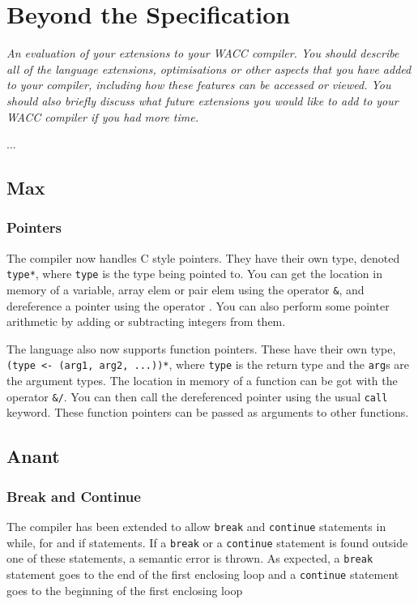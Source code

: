 \documentclass[]{article}
\newcommand{\spec}[1]{\textit{#1}\par\noindent}
\begin{document}
\section{Beyond the Specification}
\spec{An evaluation of your extensions to your WACC compiler. You should describe all of the language extensions, optimisations or other aspects that you have added to your compiler, including how these features can be accessed or viewed. You should also briefly discuss what future extensions you would like to add to your WACC compiler if you had more time.}
...
\subsection{Max}
\subsubsection{Pointers}
The compiler now handles C style pointers. They have their own type, denoted {\tt type*}, where {\tt type} is the type being pointed to. You can get the location in memory of a variable, array elem or pair elem using the operator {\tt \&}, and dereference a pointer using the operator {\tt *}. You can also perform some pointer arithmetic by adding or subtracting integers from them.

The language also now supports function pointers. These have their own type, {\tt (type <- (arg1, arg2, ...))*}, where {\tt type} is the return type and the {\tt arg}s are the argument types. The location in memory of a function can be got with the operator {\tt \&/}. You can then call the dereferenced pointer using the usual {\tt call} keyword. These function pointers can be passed as arguments to other functions.


\subsection{Anant}
\subsubsection{Break and Continue}
{The compiler has been extended to allow {\tt break} and {\tt continue} statements in while, for and if statements. If a {\tt break} or a {\tt continue} statement is found outside one of these statements, a semantic error is thrown. As expected, a {\tt break} statement goes to the end of the first enclosing loop and a {\tt continue} statement goes to the beginning of the first enclosing loop}
\end{document}
